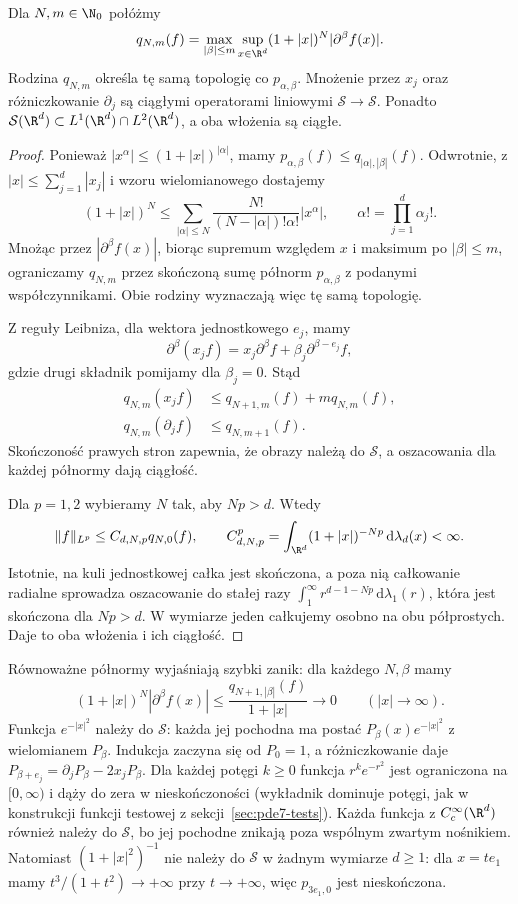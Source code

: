 \begin{lemat}
\label{lem:pde8-seminorms}
Dla $N,m\in\N_0$ połóżmy
\[
 q_{N,m}(f)=\max_{|\beta|\le m}
 \sup_{x\in\R^d}(1+|x|)^N|\partial^\beta f(x)|.
\]
Rodzina $q_{N,m}$ określa tę samą topologię co
$p_{\alpha,\beta}$. Mnożenie przez $x_j$ oraz
różniczkowanie $\partial_j$ są ciągłymi operatorami
liniowymi $\mathcal S\to\mathcal S$.
Ponadto $\mathcal S(\R^d)\subset L^1(\R^d)\cap L^2(\R^d)$,
a oba włożenia są ciągłe.
\end{lemat}
\begin{proof}
Ponieważ $|x^\alpha|\le(1+|x|)^{|\alpha|}$, mamy
$p_{\alpha,\beta}(f)\le q_{|\alpha|,|\beta|}(f)$.
Odwrotnie, z $|x|\le\sum_{j=1}^d|x_j|$ i wzoru
wielomianowego dostajemy
\[
 (1+|x|)^N\le
 \sum_{|\alpha|\le N}
 \frac{N!}{(N-|\alpha|)!\alpha!}|x^\alpha|,
 \qquad \alpha!=\prod_{j=1}^d\alpha_j!.
\]
Mnożąc przez $|\partial^\beta f(x)|$, biorąc
supremum względem $x$ i maksimum po $|\beta|\le m$,
ograniczamy $q_{N,m}$ przez skończoną sumę półnorm
$p_{\alpha,\beta}$ z podanymi współczynnikami.
Obie rodziny wyznaczają więc tę samą topologię.

Z reguły Leibniza, dla wektora jednostkowego
$e_j$, mamy
\[
 \partial^\beta(x_j f)
 =x_j\partial^\beta f+\beta_j\partial^{\beta-e_j}f,
\]
gdzie drugi składnik pomijamy dla $\beta_j=0$.
Stąd
\[
 \begin{aligned}
 q_{N,m}(x_j f)&\le q_{N+1,m}(f)+m q_{N,m}(f),\\
 q_{N,m}(\partial_j f)&\le q_{N,m+1}(f).
 \end{aligned}
\]
Skończoność prawych stron zapewnia, że obrazy
należą do $\mathcal S$, a oszacowania dla każdej
półnormy dają ciągłość.

Dla $p=1,2$ wybieramy $N$ tak, aby $Np>d$.
Wtedy
\[
 \|f\|_{L^p}\le C_{d,N,p}q_{N,0}(f),
 \qquad
 C_{d,N,p}^p=\int_{\R^d}(1+|x|)^{-Np}
 \,\mathrm d\lambda_d(x)<\infty.
\]
Istotnie, na kuli jednostkowej całka jest skończona,
a poza nią całkowanie radialne sprowadza oszacowanie
do stałej razy $\int_1^\infty r^{d-1-Np}\,
\mathrm d\lambda_1(r)$, która jest skończona dla $Np>d$.
W wymiarze jeden całkujemy osobno na obu półprostych.
Daje to oba włożenia i ich ciągłość.
\end{proof}

Równoważne półnormy wyjaśniają szybki zanik:
dla każdego $N,\beta$ mamy
\[
 (1+|x|)^N|\partial^\beta f(x)|
 \le\frac{q_{N+1,|\beta|}(f)}{1+|x|}
 \longrightarrow 0\qquad (|x|\to\infty).
\]
Funkcja $e^{-|x|^2}$ należy do $\mathcal S$:
każda jej pochodna ma postać
$P_\beta(x)e^{-|x|^2}$ z wielomianem $P_\beta$.
Indukcja zaczyna się od $P_0=1$, a różniczkowanie
daje $P_{\beta+e_j}=\partial_j P_\beta-2x_jP_\beta$.
Dla każdej potęgi $k\ge0$ funkcja
$r^k e^{-r^2}$ jest ograniczona na $[0,\infty)$
i dąży do zera w nieskończoności (wykładnik
dominuje potęgi, jak w konstrukcji funkcji
testowej z sekcji~\ref{sec:pde7-tests}).
Każda funkcja z $C_c^\infty(\R^d)$ również należy
do $\mathcal S$, bo jej pochodne znikają poza
wspólnym zwartym nośnikiem.
Natomiast $(1+|x|^2)^{-1}$ nie należy do $\mathcal S$
w żadnym wymiarze $d\ge1$: dla
$x=te_1$ mamy $t^3/(1+t^2)\to+\infty$
przy $t\to+\infty$, więc $p_{3e_1,0}$ jest nieskończona.

